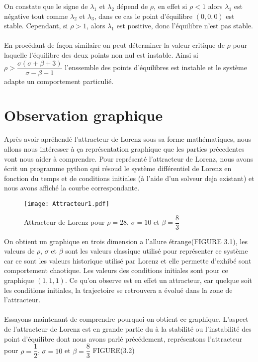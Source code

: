 On constate que le signe de  $\lambda_{1}$ et $\lambda_{2}$ dépend de $\rho$, en effet si $\rho<1$ alors $\lambda_{1}$ est négative tout comme $\lambda_{2}$ et $\lambda_{3}$, dans ce cas le point d'équilibre $(0,0,0)$ est stable. Cependant, si $\rho>1$, alors $\lambda_{1}$ est positive, donc l'équilibre n'est pas stable.\\\\
 En procédant de façon similaire on peut déterminer la valeur critique de $\rho$ pour laquelle l'équilibre des deux points non nul est instable. Ainsi si $\rho > \dfrac{\sigma(\sigma+\beta+3)}{\sigma-\beta-1}$ l'enssemble des points d'équilibres est instable et le système adapte un comportement particulié.

 \section{Observation graphique}
Après avoir apréhendé l'attracteur de Lorenz sous sa forme mathématiques, nous allons nous intéresser à ça représentation graphique que les parties précedentes vont nous aider à comprendre. Pour représenté l'attracteur de Lorenz, nous avons écrit un programme python qui résoud le système différentiel de Lorenz en fonction du temps et de conditions initiales (à l'aide d'un solveur deja existant) et nous avons affiché la courbe correspondante.\\

\begin{figure}
        \texttt{[image: Attracteur1.pdf]}
        \caption{Attracteur de Lorenz pour $\rho=28$, $\sigma=10$ et $\beta=\dfrac{8}{3}$} 
\end{figure} 

On obtient un graphique en trois dimension a l'allure étrange(FIGURE 3.1), les valeurs de $\rho$, $\sigma$ et $\beta$ sont les valeurs classique utilisé pour représenter ce système car ce sont les valeurs historique utilisé par Lorenz et elle permette d'exhibé sont comportement chaotique. Les valeurs des conditions initiales sont pour ce graphique $(1,1,1)$. Ce qu'on observe est en effet un attracteur, car quelque soit les conditions initiales, la trajectoire se retrouvera a évolué dans la zone de l'attracteur.\\\\
Essayons maintenant de comprendre pourquoi on obtient ce graphique. L'aspect de l'attracteur de Lorenz est en grande partie du à la stabilité ou l'instabilité des point d'équilibre dont nous avons parlé précédement, représentons l'attracteur pour $\rho=\dfrac{1}{2}$, $\sigma=10$ et $\beta=\dfrac{8}{3}$ FIGURE(3.2) 

